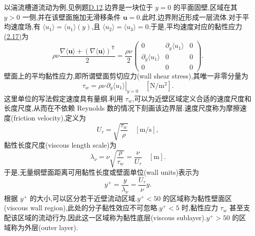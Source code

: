 \begin{note}[边界层]
\label{note:turbulent-boundary-layers}
以湍流槽道流动为例,见例题\hyperref[ex:appendix-d-12]{D.12}.边界是一块位于 $y=0$ 的平面固壁,区域在其 $y>0$ 一侧,并在该壁面施加无滑移条件 $\bm{u}=0$.此时,边界附近形成一层流体.对于平均速度场,有 $\langle u_1\rangle=\langle u_1\rangle(y)$,且 $\langle u_2\rangle=\langle u_3\rangle=0$.于是,平均速度对应的黏性应力\hyperref[eq:viscous-stress-law]{(2.17)}为
\[
 \rho\nu\frac{\nabla\langle\bm{u}\rangle
             +(\nabla\langle\bm{u}\rangle)^\mathsf{T}}{2}
 =\frac{\rho\nu}{2}
 \begin{pmatrix}
  0&\partial_y\langle u_1\rangle&0\\
  \partial_y\langle u_1\rangle&0&0\\
  0&0&0
 \end{pmatrix}.
\]
壁面上的平均黏性应力,即所谓壁面剪切应力(wall shear stress),其唯一非零分量为
\[
 \tau_w=\left.\rho\nu\,\partial_y\langle u_1\rangle\right|_{y=0}
 \quad[\mathrm{N}/\mathrm{m}^2].
\]
这里单位的写法假定速度具有量纲.利用 $\tau_w$,可以为近壁区域定义合适的速度尺度和长度尺度,从而在不依赖 Reynolds 数的情况下刻画该边界层.速度尺度称为摩擦速度(friction velocity),定义为
\[
 U_\tau=\sqrt{\frac{\tau_w}{\rho}}
 \quad[\mathrm{m}/\mathrm{s}],
\]
黏性长度尺度(viscous length scale)为
\[
 \lambda_\nu=\nu\sqrt{\frac{\rho}{\tau_w}}
  =\frac{\nu}{U_\tau}
 \quad[\mathrm{m}].
\]
于是,无量纲壁面距离可用黏性长度或壁面单位(wall units)表示为
\[
 y^+=\frac{y}{\lambda_\nu}=\frac{U_\tau}{\nu}y.
\]
根据 $y^+$ 的大小,可以区分若干近壁流动区域.$y^+<50$ 的区域称为黏性壁面区(viscous wall region),此处的分子黏性效应不可忽略.$y^+<5$ 时,黏性应力 $\tau_w$ 甚至支配该区域的流动行为,因此这一区域称为黏性底层(viscous sublayer).$y^+>50$ 的区域称为外层(outer layer).
\end{note}

